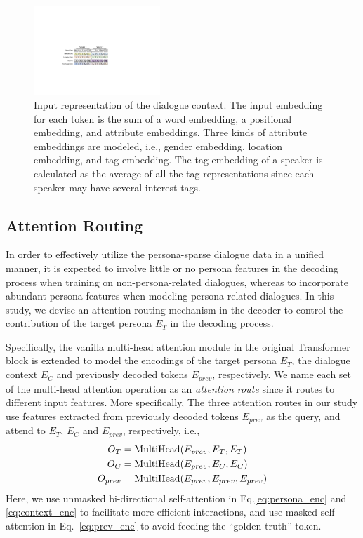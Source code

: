 \documentclass[letterpaper]{article}
\begin{document}
\begin{figure}[t]
    \centering
    \includegraphics[width=180px]{figures/fig_encoder.pdf}
    \caption{Input representation of the dialogue context. The input embedding for each token is the sum of a word embedding, a positional embedding, and attribute embeddings. Three kinds of attribute embeddings are modeled, i.e., gender embedding, location embedding, and tag embedding. The tag embedding of a speaker is calculated as the average of all the tag representations since each speaker may have several interest tags.}
    \label{fig:context_rep}
\end{figure}

\subsection{Attention Routing}
In order to effectively utilize the persona-sparse dialogue data in a unified manner, it is expected to involve little or no persona features in the decoding process when training on non-persona-related dialogues, whereas to incorporate abundant persona features when modeling persona-related dialogues. In this study, we devise an attention routing mechanism in the decoder to control the contribution of the target persona $E_T$ in the decoding process.

Specifically, the vanilla multi-head attention module in the original Transformer block is extended to model the encodings of the target persona $E_T$, the dialogue context $E_C$ and previously decoded tokens $E_{prev}$, respectively. We name each set of the multi-head attention operation as an \emph{attention route} since it routes to different input features. More specifically, The three attention routes in our study use features extracted from previously decoded tokens $E_{prev}$ as the query, and attend to $E_T$, $E_C$ and $E_{prev}$, respectively, i.e.,
\begin{align}
 O_T &= {\rm MultiHead}(E_{prev}, E_T, E_T)\label{eq:persona_enc} \\
 O_C &= {\rm MultiHead}(E_{prev}, E_C, E_C)\label{eq:context_enc} \\
 O_{prev} &= {\rm MultiHead}(E_{prev}, E_{prev}, E_{prev})\label{eq:prev_enc}
\end{align}
Here, we use unmasked bi-directional self-attention in Eq.\ref{eq:persona_enc} and \ref{eq:context_enc} to facilitate more efficient interactions, and use masked self-attention in Eq.~\ref{eq:prev_enc} to avoid feeding the ``golden truth'' token.
\end{document}
